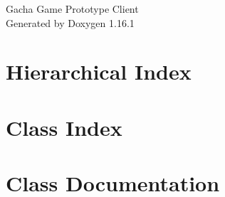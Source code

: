 \documentclass[twoside]{book}
\newcommand{\+}{\discretionary{\mbox{\scriptsize$\hookleftarrow$}}{}{}}
\newcommand{\clearemptydoublepage}{%
    \newpage{\pagestyle{empty}\cleardoublepage}%
  }
\begin{document}
  \raggedbottom
    \hypersetup{pageanchor=false,
                bookmarksnumbered=true,
                pdfencoding=unicode
               }
  \begin{titlepage}
  \vspace*{7cm}
  \begin{center}%
  {\Large Gacha Game Prototype Client}\\
  \vspace*{1cm}
  {\large Generated by Doxygen 1.16.1}\\
  \end{center}
  \end{titlepage}
  \clearemptydoublepage
  \tableofcontents
  \clearemptydoublepage
  \hypersetup{pageanchor=true}
\chapter{Hierarchical Index}

\chapter{Class Index}

\chapter{Class Documentation}





















  \backmatter
  \newpage
  \clearemptydoublepage
  \printindex
\end{document}
